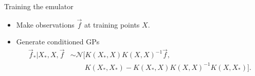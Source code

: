 \documentclass{beamer}
\begin{document}
\begin{frame}{Training the emulator}
  \begin{itemize}
    \item Make observations $\vec f$ at training points $X$.
    \item Generate conditioned GPs
        \begin{align*}
          \vec f_* | X_*,X,\vec f &\sim \mathcal N[K(X_*,X)K(X,X)^{-1}\vec f, \\
          &\qquad {} K(X_*,X_*) - K(X_*,X)K(X,X)^{-1}K(X,X_*)].
        \end{align*}
  \end{itemize}

  \centering


\end{frame}
\end{document}

